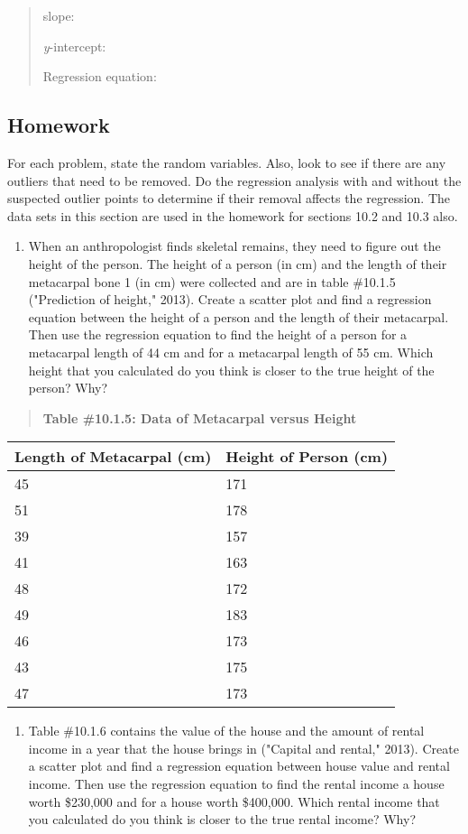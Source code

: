 \documentclass[]{book}
\providecommand{\tightlist}{%
  \setlength{\itemsep}{0pt}\setlength{\parskip}{0pt}}
\begin{document}
\begin{quote}
slope:

\emph{y}-intercept:

Regression equation:
\end{quote}

\hypertarget{homework-29}{%
\subsection{Homework}\label{homework-29}}

For each problem, state the random variables. Also, look to see if there
are any outliers that need to be removed. Do the regression analysis
with and without the suspected outlier points to determine if their
removal affects the regression. The data sets in this section are used
in the homework for sections 10.2 and 10.3 also.

\begin{enumerate}
\def\labelenumi{\arabic{enumi}.}
\tightlist
\item
  When an anthropologist finds skeletal remains, they need to figure
  out the height of the person. The height of a person (in cm) and the
  length of their metacarpal bone 1 (in cm) were collected and are in
  table \#10.1.5 ("Prediction of height," 2013). Create a scatter
  plot and find a regression equation between the height of a person
  and the length of their metacarpal. Then use the regression equation
  to find the height of a person for a metacarpal length of 44 cm and
  for a metacarpal length of 55 cm. Which height that you calculated
  do you think is closer to the true height of the person? Why?
\end{enumerate}

\begin{quote}
\textbf{Table \#10.1.5: Data of Metacarpal versus Height}
\end{quote}

\begin{longtable}[]{@{}ll@{}}
\toprule
Length of Metacarpal (cm) & Height of Person (cm)\tabularnewline
\midrule
\endhead
45 & 171\tabularnewline
51 & 178\tabularnewline
39 & 157\tabularnewline
41 & 163\tabularnewline
48 & 172\tabularnewline
49 & 183\tabularnewline
46 & 173\tabularnewline
43 & 175\tabularnewline
47 & 173\tabularnewline
\bottomrule
\end{longtable}

\begin{enumerate}
\def\labelenumi{\arabic{enumi}.}
\setcounter{enumi}{1}
\tightlist
\item
  Table \#10.1.6 contains the value of the house and the amount of
  rental income in a year that the house brings in ("Capital and
  rental," 2013). Create a scatter plot and find a regression
  equation between house value and rental income. Then use the
  regression equation to find the rental income a house worth
  \$230,000 and for a house worth \$400,000. Which rental income that
  you calculated do you think is closer to the true rental income?
  Why?
\end{enumerate}
\end{document}
